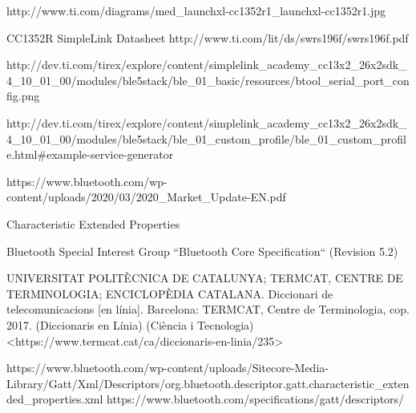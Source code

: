 \begin{thebibliography}{2}
http://www.ti.com/diagrams/med\_launchxl-cc1352r1\_launchxl-cc1352r1.jpg

CC1352R SimpleLink Datasheet
http://www.ti.com/lit/ds/swrs196f/swrs196f.pdf

http://dev.ti.com/tirex/explore/content/simplelink\_academy\_cc13x2\_26x2sdk\_4\_10\_01\_00/modules/ble5stack/ble\_01\_basic/resources/btool\_serial\_port\_config.png

http://dev.ti.com/tirex/explore/content/simplelink\_academy\_cc13x2\_26x2sdk\_4\_10\_01\_00/modules/ble5stack/ble\_01\_custom\_profile/ble\_01\_custom\_profile.html\#example-service-generator

https://www.bluetooth.com/wp-content/uploads/2020/03/2020\_Market\_Update-EN.pdf

Characteristic Extended Properties

Bluetooth Special Interest Group
``Bluetooth Core Specification``
(Revision 5.2)

UNIVERSITAT POLITÈCNICA DE CATALUNYA; TERMCAT, CENTRE DE TERMINOLOGIA; ENCICLOPÈDIA CATALANA. Diccionari de telecomunicacions [en línia]. Barcelona: TERMCAT, Centre de Terminologia, cop. 2017. (Diccionaris en Línia) (Ciència i Tecnologia)
<https://www.termcat.cat/ca/diccionaris-en-linia/235>

https://www.bluetooth.com/wp-content/uploads/Sitecore-Media-Library/Gatt/Xml/Descriptors/org.bluetooth.descriptor.gatt.characteristic\_extended\_properties.xml
https://www.bluetooth.com/specifications/gatt/descriptors/

\end{thebibliography}